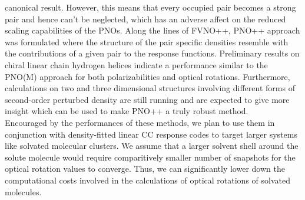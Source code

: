 canonical result. However, this means that every occupied pair becomes a 
strong pair and hence can't be neglected, which has an adverse affect
on the reduced scaling capabilities of the PNOs. Along the 
lines of FVNO++, PNO++ approach was formulated where the structure of 
the pair specific densities resemble with the contributions of a given
pair to the response functions. Preliminary results on chiral linear chain 
hydrogen helices indicate a performance similar to the PNO(M) approach
for both polarizabilities and optical rotations. Furthermore, calculations on 
two and three dimensional structures involving different forms of second-order 
perturbed density are still running and are expected to give more insight
which can be used to make PNO++ a truly robust method. \\
Encouraged by the performances of these methods, we plan to use them in 
conjunction with density-fitted linear CC response codes to target larger
systems like solvated molecular clusters. We assume that a larger solvent shell 
around the solute molecule would require comparitively smaller number of 
snapshots for the optical rotation values to converge. Thus, we can significantly
lower down the computational costs involved in the calculations of optical rotations
of solvated molecules.



